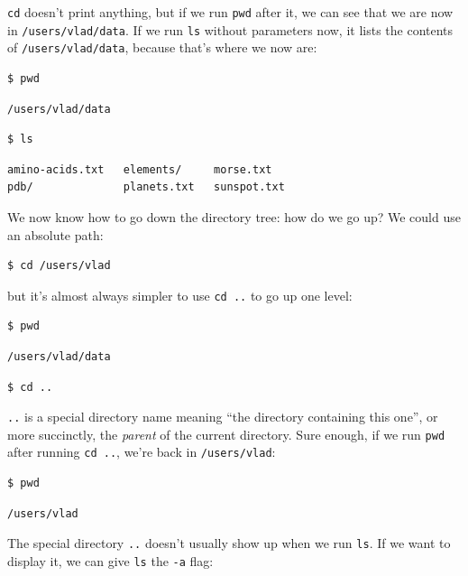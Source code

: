 \documentclass[]{book}
\newcommand{\gdef}[2]{\emph{#2}}
\begin{document}
\texttt{cd} doesn't print anything, but if we run \texttt{pwd} after it,
we can see that we are now in \texttt{/users/vlad/data}. If we run
\texttt{ls} without parameters now, it lists the contents of
\texttt{/users/vlad/data}, because that's where we now are:

\begin{verbatim}
$ pwd
\end{verbatim}

\begin{verbatim}
/users/vlad/data
\end{verbatim}

\begin{verbatim}
$ ls
\end{verbatim}

\begin{verbatim}
amino-acids.txt   elements/     morse.txt
pdb/              planets.txt   sunspot.txt
\end{verbatim}

We now know how to go down the directory tree: how do we go up? We could
use an absolute path:

\begin{verbatim}
$ cd /users/vlad
\end{verbatim}

but it's almost always simpler to use \texttt{cd ..} to go up one level:

\begin{verbatim}
$ pwd
\end{verbatim}

\begin{verbatim}
/users/vlad/data
\end{verbatim}

\begin{verbatim}
$ cd ..
\end{verbatim}

\texttt{..} is a special directory name meaning ``the directory
containing this one'', or more succinctly, the
\gdef{g:parent-directory}{parent} of the current directory. Sure
enough, if we run \texttt{pwd} after running \texttt{cd ..}, we're back
in \texttt{/users/vlad}:

\begin{verbatim}
$ pwd
\end{verbatim}

\begin{verbatim}
/users/vlad
\end{verbatim}

The special directory \texttt{..} doesn't usually show up when we run
\texttt{ls}. If we want to display it, we can give \texttt{ls} the
\texttt{-a} flag:
\end{document}
